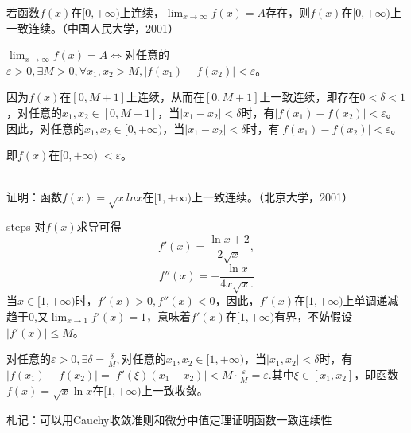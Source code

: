  \begin{example}
  若函数$f(x)$在$[0,+\infty)$上连续，$\displaystyle\lim_{x\rightarrow\infty}f(x)=A$存在，则$f(x)$在$[0,+\infty)$上一致连续。（中国人民大学，2001）
 
  $\lim_{x\rightarrow\infty}f(x)=A\Leftrightarrow$对任意的$\varepsilon>0,\exists M>0,\forall x_1,x_2>M,|f(x_1)-f(x_2)|<\varepsilon$。
  
  因为$f(x)$在$[0,M+1]$上连续，从而在$[0,M+1]$上一致连续，即存在$0<\delta<1$，对任意的$x_1,x_2\in[0,M+1]$，当$|x_1-x_2|<\delta$时，有$|f(x_1)-f(x_2)|<\varepsilon$。因此，对任意的$x_1,x_2\in[0,+\infty)$，当$|x_1-x_2|<\delta$时，有$|f(x_1)-f(x_2)|<\varepsilon$。
  
  即$f(x)$在$[0,+\infty)|<\varepsilon$。
  \end{example}
  \begin{example}
  \hfill\\
  证明：函数$f(x)=\sqrt{x}lnx$在$[1,+\infty)$上一致连续。（北京大学，2001）
  
  steps
  对$f(x)$求导可得
  \[f'(x)=\frac{\ln x+2}{2\sqrt x},\]
  \[f''(x)=-\frac{\ln x}{4x\sqrt x.}\]
  当$x\in[1,+\infty)$时，$f'(x)>0,f''(x)<0$，因此，$f'(x)$在$[1,+\infty)$上单调递减趋于0,又$\lim_{x\rightarrow1}f'(x)=1$，意味着$f'(x)$在$[1,+\infty)$有界，不妨假设$|f'(x)|\leq M$。
  
  对任意的$\varepsilon>0,\exists\delta=\frac{\delta}M,$对任意的$x_1,x_2\in[1,+\infty)$，当$|x_1,x_2|<\delta$时，有$|f(x_1)-f(x_2)|=|f'(\xi)(x_1-x_2)|<M\cdot\frac{\varepsilon}{M}=\varepsilon.$其中$\xi\in[x_1,x_2]$，即函数$f(x)=\sqrt{x}\ln x$在$[1,+\infty)$上一致收敛。
  \end{example}

\begin{remark}
  札记：可以用Cauchy收敛准则和微分中值定理证明函数一致连续性
\end{remark}

